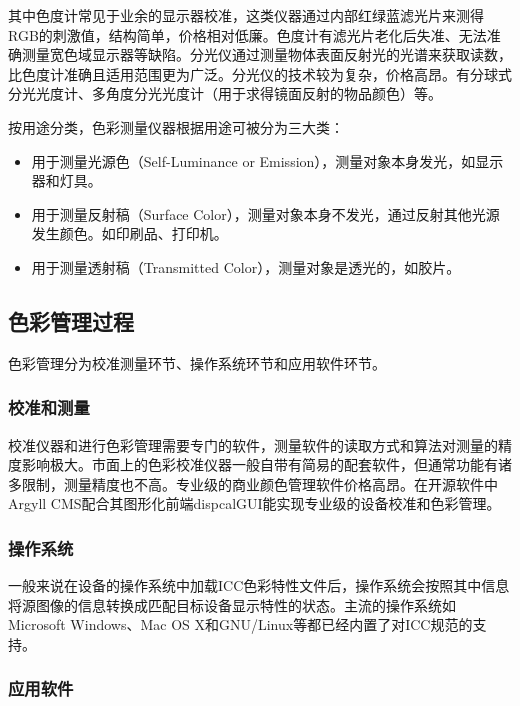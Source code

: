     其中色度计常见于业余的显示器校准，这类仪器通过内部红绿蓝滤光片来测得RGB的刺激值，结构简单，价格相对低廉。色度计有滤光片老化后失准、无法准确测量宽色域显示器等缺陷。分光仪通过测量物体表面反射光的光谱来获取读数，比色度计准确且适用范围更为广泛。分光仪的技术较为复杂，价格高昂。有分球式分光光度计、多角度分光光度计（用于求得镜面反射的物品颜色）等。

    按用途分类，色彩测量仪器根据用途可被分为三大类：

    \begin{itemize}
        \item  用于测量光源色（Self-Luminance or Emission），测量对象本身发光，如显示器和灯具。
        \item  用于测量反射稿（Surface Color），测量对象本身不发光，通过反射其他光源发生颜色。如印刷品、打印机。
        \item  用于测量透射稿（Transmitted Color），测量对象是透光的，如胶片。
    \end{itemize}

\subsection {色彩管理过程}

    色彩管理分为校准测量环节、操作系统环节和应用软件环节。

    \subsubsection {校准和测量}

    校准仪器和进行色彩管理需要专门的软件，测量软件的读取方式和算法对测量的精度影响极大。市面上的色彩校准仪器一般自带有简易的配套软件，但通常功能有诸多限制，测量精度也不高。专业级的商业颜色管理软件价格高昂。在开源软件中Argyll CMS配合其图形化前端dispcalGUI能实现专业级的设备校准和色彩管理。

    \subsubsection {操作系统}

    一般来说在设备的操作系统中加载ICC色彩特性文件后，操作系统会按照其中信息将源图像的信息转换成匹配目标设备显示特性的状态。主流的操作系统如Microsoft Windows、Mac OS X和GNU/Linux等都已经内置了对ICC规范的支持。

    \subsubsection {应用软件}

